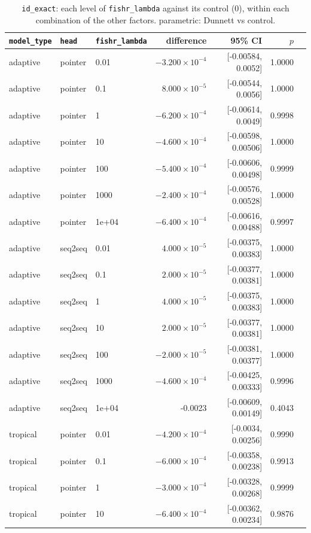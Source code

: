 \documentclass[10pt]{article}
\begin{document}
{\small
\begin{longtable}{lllrrrl}
\caption{\texttt{id\_exact}: each level of \texttt{fishr\_lambda} against its control (0), within each combination of the other factors. parametric: Dunnett vs control.}\label{tab:control-id_exact}\\
\toprule
\texttt{model\_type} & \texttt{head} & \texttt{fishr\_lambda} & difference & 95\% CI & $p$ & \\
\midrule
\endhead
adaptive & pointer & 0.01 & $-3.200\times10^{-4}$ & [-0.00584, 0.0052] & 1.0000 & \\
adaptive & pointer & 0.1 & $8.000\times10^{-5}$ & [-0.00544, 0.0056] & 1.0000 & \\
adaptive & pointer & 1 & $-6.200\times10^{-4}$ & [-0.00614, 0.0049] & 0.9998 & \\
adaptive & pointer & 10 & $-4.600\times10^{-4}$ & [-0.00598, 0.00506] & 1.0000 & \\
adaptive & pointer & 100 & $-5.400\times10^{-4}$ & [-0.00606, 0.00498] & 0.9999 & \\
adaptive & pointer & 1000 & $-2.400\times10^{-4}$ & [-0.00576, 0.00528] & 1.0000 & \\
adaptive & pointer & 1e+04 & $-6.400\times10^{-4}$ & [-0.00616, 0.00488] & 0.9997 & \\
adaptive & seq2seq & 0.01 & $4.000\times10^{-5}$ & [-0.00375, 0.00383] & 1.0000 & \\
adaptive & seq2seq & 0.1 & $2.000\times10^{-5}$ & [-0.00377, 0.00381] & 1.0000 & \\
adaptive & seq2seq & 1 & $4.000\times10^{-5}$ & [-0.00375, 0.00383] & 1.0000 & \\
adaptive & seq2seq & 10 & $2.000\times10^{-5}$ & [-0.00377, 0.00381] & 1.0000 & \\
adaptive & seq2seq & 100 & $-2.000\times10^{-5}$ & [-0.00381, 0.00377] & 1.0000 & \\
adaptive & seq2seq & 1000 & $-4.600\times10^{-4}$ & [-0.00425, 0.00333] & 0.9996 & \\
adaptive & seq2seq & 1e+04 & -0.0023 & [-0.00609, 0.00149] & 0.4043 & \\
tropical & pointer & 0.01 & $-4.200\times10^{-4}$ & [-0.0034, 0.00256] & 0.9990 & \\
tropical & pointer & 0.1 & $-6.000\times10^{-4}$ & [-0.00358, 0.00238] & 0.9913 & \\
tropical & pointer & 1 & $-3.000\times10^{-4}$ & [-0.00328, 0.00268] & 0.9999 & \\
tropical & pointer & 10 & $-6.400\times10^{-4}$ & [-0.00362, 0.00234] & 0.9876 & \\

\end{longtable}}
\end{document}
